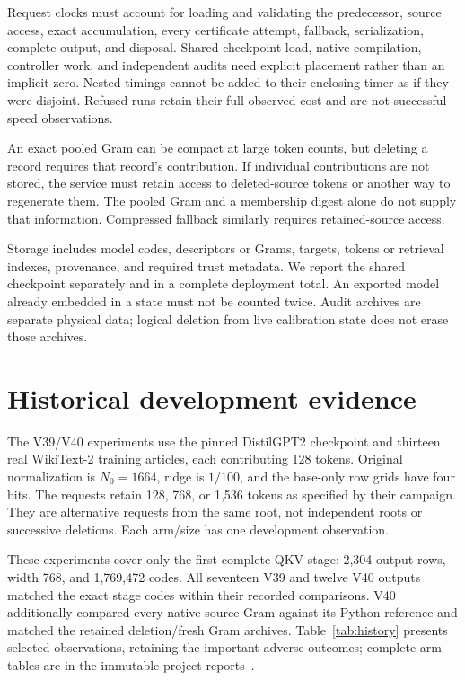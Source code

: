 \documentclass[10pt,twocolumn,letterpaper]{article}
\begin{document}
Request clocks must account for loading and validating the predecessor, source
access, exact accumulation, every certificate attempt, fallback, serialization,
complete output, and disposal. Shared checkpoint load, native compilation,
controller work, and independent audits need explicit placement rather than an
implicit zero. Nested timings cannot be added to their enclosing timer as if they
were disjoint. Refused runs retain their full observed cost and are not successful
speed observations.

An exact pooled Gram can be compact at large token counts, but deleting a record
requires that record's contribution. If individual contributions are not stored,
the service must retain access to deleted-source tokens or another way to
regenerate them. The pooled Gram and a membership digest alone do not supply that
information. Compressed fallback similarly requires retained-source access.

Storage includes model codes, descriptors or Grams, targets, tokens or retrieval
indexes, provenance, and required trust metadata. We report the shared checkpoint
separately and in a complete deployment total. An exported model already embedded
in a state must not be counted twice. Audit archives are separate physical data;
logical deletion from live calibration state does not erase those archives.

\section{Historical development evidence}
\label{sec:history}
The V39/V40 experiments use the pinned DistilGPT2 checkpoint and thirteen real
WikiText-2 training articles, each contributing 128 tokens. Original normalization
is $N_0=1664$, ridge is $1/100$, and the base-only row grids have four bits. The
requests retain 128, 768, or 1,536 tokens as specified by their campaign. They are
alternative requests from the same root, not independent roots or successive
deletions. Each arm/size has one development observation.

These experiments cover only the first complete QKV stage: 2,304 output rows,
width 768, and 1,769,472 codes. All seventeen V39 and twelve V40 outputs matched
the exact stage codes within their recorded comparisons. V40 additionally
compared every native source Gram against its Python reference and matched the
retained deletion/fresh Gram archives. Table~\ref{tab:history} presents selected
observations, retaining the important adverse outcomes; complete arm tables are
in the immutable project reports~\cite{v39,v40}.
\end{document}
